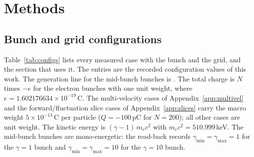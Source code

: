\section*{Methods}
\label{sec:methods}

\subsection{Bunch and grid configurations}
\label{sec:configs}

Table~\ref{tab:configs} lists every measured case with the bunch and the
grid, and the section that uses it. The entries are the recorded
configuration values of this work. The generation line for the mid-bunch
bunches is
. The total charge is $N$ times $-e$ for the electron bunches with
one unit weight, where $e = 1.602176634\times10^{-19}$\,C. The multi-velocity
cases of Appendix~\ref{app:multivel} and the forward/fluctuation slice cases
of Appendix~\ref{app:slices} carry the macro weight
$5\times10^{-13}$\,C per particle ($Q=-100$\,pC for $N=200$); all other cases
are unit weight. The kinetic
energy is $(\gamma-1)\,m_ec^2$ with $m_ec^2 = 510.999$\,keV. The mid-bunch
bunches are mono-energetic: the read-back records
$\gamma_{\min}=\gamma_{\max}=1$ for the $\gamma=1$ bunch and
$\gamma_{\min}=\gamma_{\max}=10$ for the $\gamma=10$ bunch.

